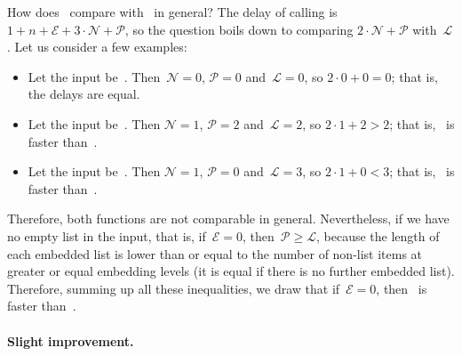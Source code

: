 How does~ compare with~ in general?
The delay of calling  is \(1 + n + \mathcal{E} + 3
\cdot \mathcal{N} + \mathcal{P}\), so the question boils down to
comparing \(2 \cdot \mathcal{N} + \mathcal{P}\)
with~\(\mathcal{L}\). Let us consider a few examples:
\begin{itemize}

  \item Let the input be~\erlcode{[a,b]}. Then~\(\mathcal{N} = 0\),
    \(\mathcal{P} = 0\) and~\(\mathcal{L} = 0\), so \(2 \cdot 0 + 0 =
    0\); that is, the delays are equal.

  \item Let the input be~\erlcode{[[a,b]]}. Then \(\mathcal{N} = 1\),
    \(\mathcal{P} = 2\) and~\(\mathcal{L} = 2\), so \(2 \cdot 1 + 2 >
    2\); that is, ~is faster than~.

  \item Let the input be~\erlcode{[[[],[],[]]]}. Then \(\mathcal{N} =
    1\), \(\mathcal{P} = 0\) and~\(\mathcal{L} = 3\), so \(2 \cdot 1 +
    0 < 3\); that is, ~is faster
    than~.

\end{itemize}
Therefore, both functions are not comparable in general. Nevertheless,
if we have no empty list in the input, that is, if~\(\mathcal{E} =
0\), then~\(\mathcal{P} \geqslant \mathcal{L}\), because the length of
each embedded list is lower than or equal to the number of
non\hyp{}list items at greater or equal embedding levels (it is equal
if there is no further embedded list). Therefore, summing up all these
inequalities, we draw that if~\(\mathcal{E} = 0\), then
~is faster than~.

\medskip

\paragraph{Slight improvement.}

